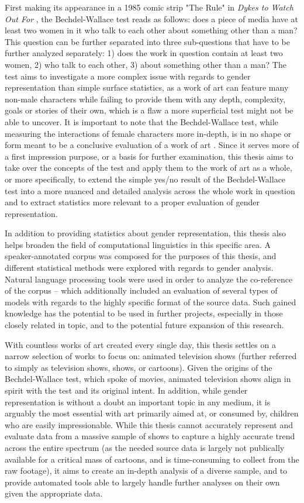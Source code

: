 \documentclass[a4paper, 11pt]{article}
\begin{document}
First making its appearance in a 1985 comic strip "The Rule" in \textit{Dykes to Watch Out For} \citep{bechdel}, the Bechdel-Wallace test reads as follows: does a piece of media have at least two women in it who talk to each other about something other than a man? This question can be further separated into three sub-questions that have to be further analyzed separately: 1) does the work in question contain at least two women, 2) who talk to each other, 3) about something other than a man? The test aims to investigate a more complex issue with regards to gender representation than simple surface statistics, as a work of art can feature many non-male characters while failing to provide them with any depth, complexity, goals or stories of their own, which is a flaw a more superficial test might not be able to uncover. It is important to note that the Bechdel-Wallace test, while measuring the interactions of female characters more in-depth, is in no shape or form meant to be a conclusive evaluation of a work of art \citep{zeisler}. Since it serves more of a first impression purpose, or a basis for further examination, this thesis aims to take over the concepts of the test and apply them to the work of art as a whole, or more specifically, to extend the simple yes/no result of the Bechdel-Wallace test into a more nuanced and detailed analysis across the whole work in question and to extract statistics more relevant to a proper evaluation of gender representation.

In addition to providing statistics about gender representation, this thesis also helps broaden the field of computational linguistics in this specific area. A speaker-annotated corpus was composed for the purposes of this thesis, and different statistical methods were explored with regards to gender analysis. Natural language processing tools were used in order to analyze the co-reference of the corpus -- which additionally included an evaluation of several types of models with regards to the highly specific format of the source data. Such gained knowledge has the potential to be used in further projects, especially in those closely related in topic, and to the potential future expansion of this research.

With countless works of art created every single day, this thesis settles on a narrow selection of works to focus on: animated television shows (further referred to simply as television shows, shows, or cartoons). Given the origins of the Bechdel-Wallace test, which spoke of movies, animated television shows align in spirit with the test and its original intent. In addition, while gender representation is without a doubt an important topic in any medium, it is arguably the most essential with art primarily aimed at, or consumed by, children who are easily impressionable. While this thesis cannot accurately represent and evaluate data from a massive sample of shows to capture a highly accurate trend across the entire spectrum (as the needed source data is largely not publically available for a critical mass of cartoons, and is time-consuming to collect from the raw footage), it aims to create an in-depth analysis of a diverse sample, and to provide automated tools able to largely handle further analyses on their own given the appropriate data.
\end{document}
